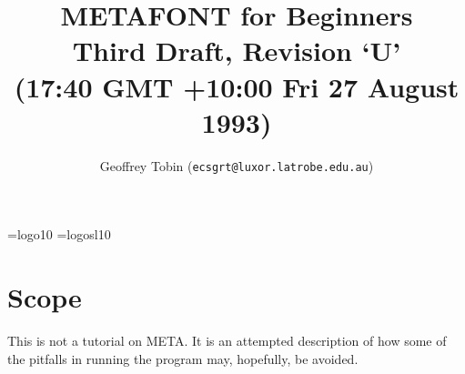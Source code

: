 

\oddsidemargin=0in
\evensidemargin=0in
\marginparwidth=0in
\marginparsep=0in


\textwidth=6.25in


\addtolength{\textheight}{\topmargin}
\topmargin=0in
\addtolength{\textheight}{0.4in}

\font\mf=logo10
\font\mfsl=logosl10
\hyphenchar{}
\hyphenchar{}
\newcommand{\MF}{{\mf META}\-{\mf FONT\/}}
\newcommand{\MFSL}{{\mfsl META}\-{\mfsl FONT\/}}
\newcommand{\MFbook}{{\sl The \MFSL{}book\/}}
\newcommand{\TeXbook}{{\sl The \TeX{}book\/}}
\newcommand{\BibTeX}{{\rm B\kern-.05em{\sc i\kern-.025em b}\kern-.08em
                      T\kern-.1667em\lower.7ex\hbox{E}\kern-.125emX}}
\newcommand{\ttbsl}{{\tt \char`\\\/}}  %

\title{%
  \vspace*{-1in}%
  METAFONT for Beginners\\%
  {\normalsize Third Draft, Revision `U'}\\%
  {\normalsize (17:40 GMT +10:00 Fri 27 August 1993)}%
}

\date{}

\author{Geoffrey {\sc Tobin} ({\tt ecsgrt@luxor.latrobe.edu.au})}



\maketitle

\tableofcontents

\newpage


\section*{Scope}%

This is not a tutorial on \MF{}.  It is an attempted description of
how some of the pitfalls in running the program may, hopefully, be
avoided.


